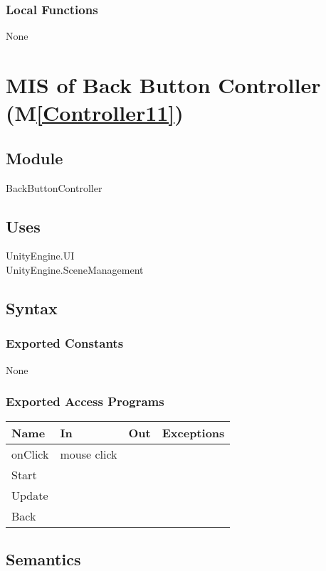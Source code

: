 \documentclass[12pt, titlepage]{article}
\newcommand{\mref}[1]{M\ref{#1}}
\begin{document}
\subsubsection{Local Functions}
None

\newpage

\section{MIS of Back Button Controller (\mref{Controller11})}  

\subsection{Module}
BackButtonController

\subsection{Uses}
UnityEngine.UI\\
UnityEngine.SceneManagement\\

\subsection{Syntax}
\subsubsection{Exported Constants}
None
\subsubsection{Exported Access Programs}

\begin{center}
\begin{tabular}{|l|l|l|p{5cm}|}
\hline
\textbf{Name} & \textbf{In} & \textbf{Out} & \textbf{Exceptions} \\
\hline
onClick & mouse click &  &  \\
\hline
Start & & & \\
\hline
Update & & & \\
\hline
Back & &  & \\
\hline
\end{tabular}
\end{center}

\subsection{Semantics}
\end{document}
